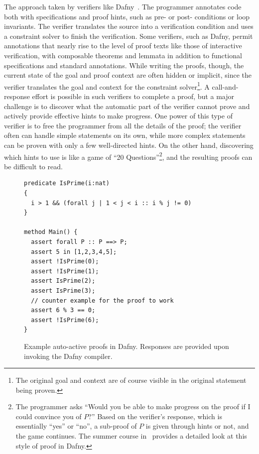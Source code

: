 The approach taken by verifiers like Dafny~\cite{leino2010dafny}. The programmer
annotates code both with specifications and proof hints, such as pre- or post-
conditions or loop invariants. The verifier translates the source into a
verification condition and uses a constraint solver to finish the verification.
Some verifiers, such as Dafny, permit annotations that nearly rise to the level
of proof texts like those of interactive verification, with composable theorems
and lemmata in addition to functional specifications and standard annotations.
While writing the proofs, though, the current state of the  goal and proof
context are often hidden or implicit, since the verifier translates the goal and
context for the constraint solver\footnote{The original goal and context are of
course visible in the original statement being proven.}. A call-and-response
effort is possible in such verifiers to complete a proof, but a major challenge
is to discover what the automatic part of the verifier cannot prove and actively
provide effective hints to make progress. One power of this type of verifier is
to free the programmer from all the details of the proof; the verifier often can
handle simple statements on its own, while more complex statements can be proven
with only a few well-directed hints. On the other hand, discovering which hints
to use is like a game of ``20 Questions''\footnote{The programmer asks ``Would
you be able to make progress on the proof if I could convince you of \(P\)?''
Based on the verifier's response, which is essentially ``yes'' or ``no'', a
sub-proof of \(P\) is given through hints or not, and the game continues. The
summer course in~\cite{Kapritsos_2020} provides a detailed look at this style of
proof in Dafny.}, and the resulting proofs can be difficult to read.

\begin{figure}[ht]
\begin{verbatim}
predicate IsPrime(i:nat)
{
  i > 1 && (forall j | 1 < j < i :: i % j != 0)
}

method Main() {
  assert forall P :: P ==> P;
  assert 5 in [1,2,3,4,5];
  assert !IsPrime(0);
  assert !IsPrime(1);
  assert IsPrime(2);
  assert IsPrime(3);
  // counter example for the proof to work
  assert 6 % 3 == 0;
  assert !IsPrime(6);
}
\end{verbatim}
    \caption{Example auto-active proofs in Dafny. Responses are provided upon
    invoking the Dafny compiler.}\label{F:dafny_ex}
\end{figure}

